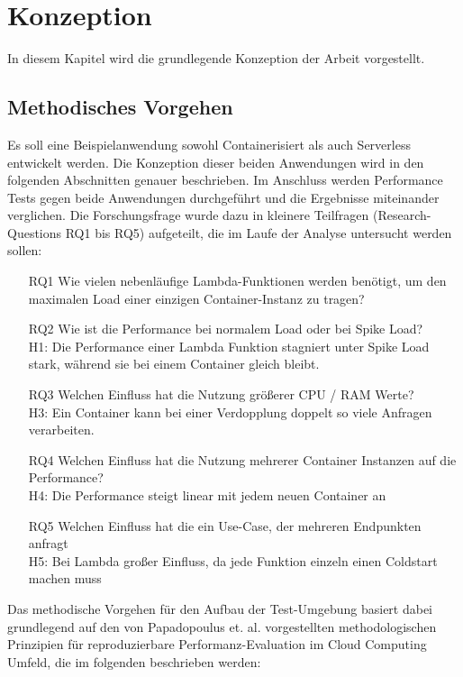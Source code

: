 \chapter{Konzeption}
In diesem Kapitel wird die grundlegende Konzeption der Arbeit vorgestellt.

\section{Methodisches Vorgehen}
Es soll eine Beispielanwendung sowohl Containerisiert als auch Serverless entwickelt werden. Die Konzeption dieser beiden Anwendungen wird in den folgenden Abschnitten genauer beschrieben. 
Im Anschluss werden Performance Tests gegen beide Anwendungen durchgeführt und die Ergebnisse miteinander verglichen. Die Forschungsfrage wurde dazu in kleinere Teilfragen (Research-Questions RQ1 bis RQ5) aufgeteilt, die im Laufe der Analyse untersucht werden sollen:

\begin{enumerate}
    \item[RQ1] Wie vielen nebenläufige Lambda-Funktionen werden benötigt, um den maximalen Load einer einzigen Container-Instanz zu tragen?
    
    \item[RQ2] Wie ist die Performance bei normalem Load oder bei Spike Load? \\
    H1: Die Performance einer Lambda Funktion stagniert unter Spike Load stark, während sie bei einem Container gleich bleibt.

    \item[RQ3] Welchen Einfluss hat die Nutzung größerer CPU / RAM Werte? \\
    H3: Ein Container kann bei einer Verdopplung doppelt so viele Anfragen verarbeiten.
    
    \item[RQ4] Welchen Einfluss hat die Nutzung mehrerer Container Instanzen auf die Performance? \\
    H4: Die Performance steigt linear mit jedem neuen Container an
    
    \item[RQ5] Welchen Einfluss hat die ein Use-Case, der mehreren Endpunkten anfragt\\
    H5: Bei Lambda großer Einfluss, da jede Funktion einzeln einen Coldstart machen muss
\end{enumerate}

Das methodische Vorgehen für den Aufbau der Test-Umgebung basiert dabei grundlegend auf den von Papadopoulus et. al. vorgestellten methodologischen Prinzipien für reproduzierbare Performanz-Evaluation im Cloud Computing Umfeld, die im folgenden beschrieben werden\cite{papadopoulos_methodological_2019}:

